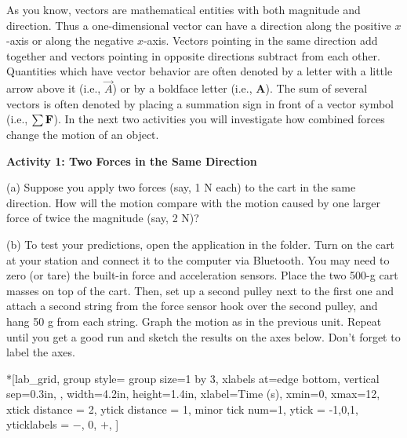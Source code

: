 As you know, vectors are mathematical entities with both magnitude and
direction. Thus a one-dimensional vector can have a direction along the positive
$x$-axis or along the negative $x$-axis. Vectors pointing in the same direction
add together and vectors pointing in opposite directions subtract from each
other. Quantities which have vector behavior are often denoted by a letter with
a little arrow above it (i.e., $\vec{A}$) or by a boldface letter (i.e., \textbf{A}). The sum of several vectors is often denoted by placing a summation sign in front of a vector
symbol (i.e., $\sum \bf F$). In the next two activities you will
investigate how combined forces change the motion of an object.

\textbf{Activity 1: Two Forces in the Same Direction}

(a) Suppose you apply two forces (say, 1 N each) to the cart in the same direction. How
will the motion compare with the motion caused by one larger force of twice the magnitude (say, 2 N)? 
\answerspace{20mm}

\pagebreak[3]
(b) To test your predictions, open the  application in the \filename{\coursefolder} folder. Turn on the cart at your station and connect it to the computer via Bluetooth. You may need to zero (or tare) the built-in force and acceleration sensors. Place the two 500-g cart masses on top of the cart. Then, set up a second pulley next to the first one and attach a second string from the force sensor hook over the second pulley, and hang 50 g from each string. Graph the motion as in the previous unit. Repeat until you get a good run and sketch the results on the axes below. Don't forget to label the axes.

\begin{lab_groupplot}*{}[lab_grid,
	group style={
		group size=1 by 3,
		xlabels at=edge bottom,
		vertical sep=0.3in,
		},
	width=4.2in,  height=1.4in,
	xlabel=Time (s),
	xmin=0, xmax=12,
	xtick distance = 2, 
	ytick distance = 1, 
	minor tick num=1,
	ytick = {-1,0,1},
	yticklabels = {$-$, 0, $+$},
	]
\nextgroupplot[
	ymin=-1,ymax=1, 
	ylabel={Velocity (m/s)},
	]
\nextgroupplot[
	ymin=-1,ymax=1, 
	ylabel={Acceleration (m/s$^2$)},
	]
\nextgroupplot[
	ymin=-1,ymax=1, 
	ylabel={Force (N)},
	]
\end{lab_groupplot}

